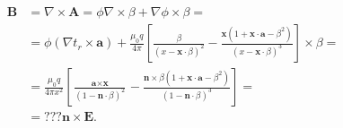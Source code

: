 \documentclass[english, parskip=full]{scrartcl}
\newcommand{\kla}{}
\newcommand{\klam}{}
\begin{document}
\begin{align}
\textbf{B} &= \nabla\times \textbf{A} = \phi \nabla\times\beta + \nabla\phi \times\beta = \\
&= \phi \kla\left( \nabla t_r \times \textbf{a} \right) + \frac{\mu_0 q}{4\pi } \klam\left[ \frac{\beta}{(x - \textbf{x}\cdot \beta)^2} - \frac{\textbf{x} \kla\left( 1 + \textbf{x}\cdot \textbf{a} - \beta^2 \right)}{(x - \textbf{x}\cdot \beta)^3} \right] \times \beta = \\
&= \frac{\mu_0 q}{4\pi x^2} \klam\left[ \frac{\textbf{a}\times \textbf{x}}{(1 - \textbf{n} \cdot \beta)^2} - \frac{\textbf{n} \times \beta \kla\left( 1 + \textbf{x}\cdot \textbf{a} - \beta^2 \right)}{(1 - \textbf{n}\cdot\beta)^3}  \right] = \\
&= ??? \textbf{n} \times \textbf{E}.
\end{align}

\end{document}
